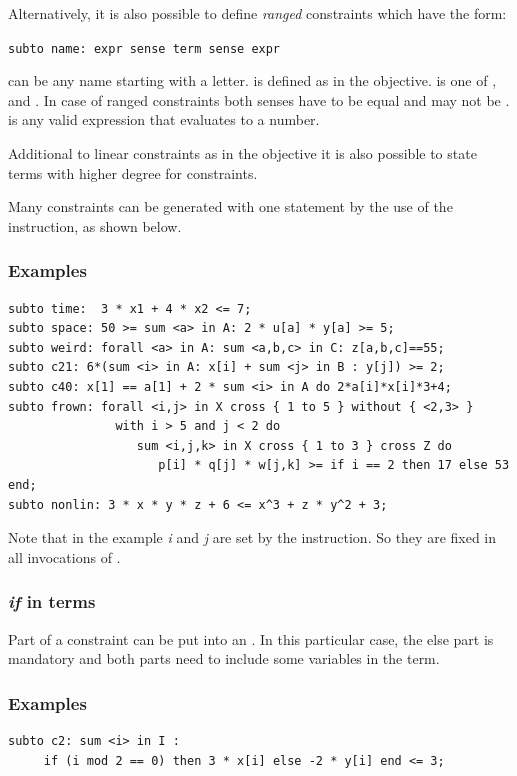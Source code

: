 \smallskip
\noindent Alternatively, it is also possible to define \emph{ranged} constraints
which have the form:

\smallskip
\verb|subto name: expr sense term sense expr|

\smallskip
\noindent {} can be any name starting with a letter.  is defined
as in the objective.  is one of
\code{<=}, \code{>=} and \code{==}. In case of ranged constraints
both senses have to be equal and may not be \code{==}.  is any
valid expression that evaluates to a number.

Additional to linear constraints as in the objective it is also
possible to state terms with higher degree for constraints.

Many constraints can be generated with one statement by the use of the
 instruction, as shown below.

\subsubsection{Examples}
{\small
\begin{verbatim}
subto time:  3 * x1 + 4 * x2 <= 7;
subto space: 50 >= sum <a> in A: 2 * u[a] * y[a] >= 5;
subto weird: forall <a> in A: sum <a,b,c> in C: z[a,b,c]==55;
subto c21: 6*(sum <i> in A: x[i] + sum <j> in B : y[j]) >= 2;
subto c40: x[1] == a[1] + 2 * sum <i> in A do 2*a[i]*x[i]*3+4;
subto frown: forall <i,j> in X cross { 1 to 5 } without { <2,3> }
               with i > 5 and j < 2 do
                  sum <i,j,k> in X cross { 1 to 3 } cross Z do
                     p[i] * q[j] * w[j,k] >= if i == 2 then 17 else 53 end;
subto nonlin: 3 * x * y * z + 6 <= x^3 + z * y^2 + 3;
\end{verbatim}
}
\noindent Note that in the example \emph{i} and \emph{j} are set by the 
instruction. So they are fixed in all invocations of .

\subsubsection{\emph{if} in terms}
Part of a constraint can be put into an .
In this particular case, the else part is mandatory and both parts
need to include some variables in the term.

\subsubsection{Examples}
{\small
\begin{verbatim}
subto c2: sum <i> in I :
     if (i mod 2 == 0) then 3 * x[i] else -2 * y[i] end <= 3;
\end{verbatim}
}

